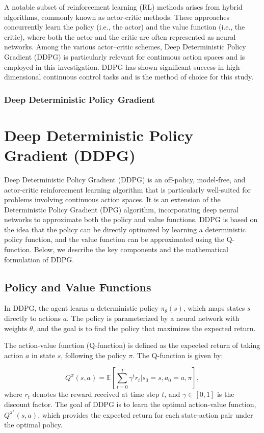 \documentclass[conference]{IEEEtran}
\begin{document}
A notable subset of reinforcement learning (RL) methods arises from hybrid algorithms, commonly known as actor-critic methods. These approaches concurrently learn the policy (i.e., the actor) and the value function (i.e., the critic), where both the actor and the critic are often represented as neural networks. Among the various actor–critic schemes, Deep Deterministic Policy Gradient (DDPG) \cite{52} is particularly relevant for continuous action spaces and is employed in this investigation. DDPG has shown significant success in high-dimensional continuous control tasks and is the method of choice for this study.


\subsubsection{Deep Deterministic Policy Gradient}
\section{Deep Deterministic Policy Gradient (DDPG)}

Deep Deterministic Policy Gradient (DDPG) is an off-policy, model-free, and actor-critic reinforcement learning algorithm that is particularly well-suited for problems involving continuous action spaces. It is an extension of the Deterministic Policy Gradient (DPG) algorithm, incorporating deep neural networks to approximate both the policy and value functions. DDPG is based on the idea that the policy can be directly optimized by learning a deterministic policy function, and the value function can be approximated using the Q-function. Below, we describe the key components and the mathematical formulation of DDPG.

\subsection{Policy and Value Functions}

In DDPG, the agent learns a deterministic policy \( \pi_{\theta}(s) \), which maps states \( s \) directly to actions \( a \). The policy is parameterized by a neural network with weights \( \theta \), and the goal is to find the policy that maximizes the expected return.

The action-value function (Q-function) is defined as the expected return of taking action \( a \) in state \( s \), following the policy \( \pi \). The Q-function is given by:

\begin{equation}
    Q^{\pi}(s, a) = \mathbb{E} \left[ \sum_{t=0}^{T} \gamma^t r_t | s_0 = s, a_0 = a, \pi \right],
\end{equation}
where \( r_t \) denotes the reward received at time step \( t \), and \( \gamma \in [0, 1] \) is the discount factor. The goal of DDPG is to learn the optimal action-value function, \( Q^{\pi^*}(s, a) \), which provides the expected return for each state-action pair under the optimal policy.
\end{document}
